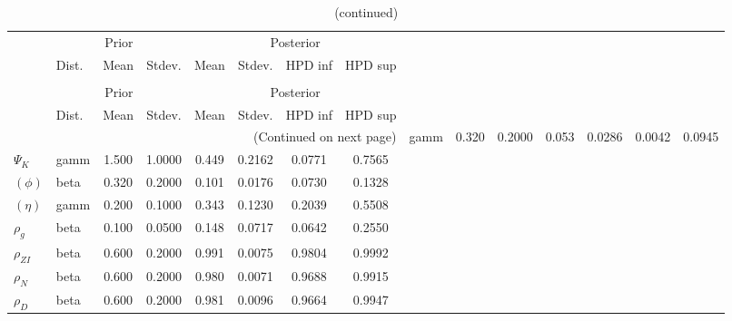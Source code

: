  
\begin{center}
\begin{longtable}{llcccccc} 
\caption{Results from Metropolis-Hastings (parameters)}
 \label{Table:MHPosterior:1}\\
\toprule 
  & \multicolumn{3}{c}{Prior}  &  \multicolumn{4}{c}{Posterior} \\
  \cmidrule(r{.75em}){2-4} \cmidrule(r{.75em}){5-8}
  & Dist. & Mean  & Stdev. & Mean & Stdev. & HPD inf & HPD sup\\
\midrule \endfirsthead 
\caption{(continued)}\\\toprule 
  & \multicolumn{3}{c}{Prior}  &  \multicolumn{4}{c}{Posterior} \\
  \cmidrule(r{.75em}){2-4} \cmidrule(r{.75em}){5-8}
  & Dist. & Mean  & Stdev. & Mean & Stdev. & HPD inf & HPD sup\\
\midrule \endhead 
\bottomrule \multicolumn{8}{r}{(Continued on next page)} \endfoot 
\bottomrule \endlastfoot 
${\sigma_a}$ & gamm &   0.320 & 0.2000 &   0.053& 0.0286 &  0.0042 &  0.0945 \\ 
${\Psi_K}$ & gamm &   1.500 & 1.0000 &   0.449& 0.2162 &  0.0771 &  0.7565 \\ 
$(\phi)$ & beta &   0.320 & 0.2000 &   0.101& 0.0176 &  0.0730 &  0.1328 \\ 
$(\eta)$ & gamm &   0.200 & 0.1000 &   0.343& 0.1230 &  0.2039 &  0.5508 \\ 
${\rho_g}$ & beta &   0.100 & 0.0500 &   0.148& 0.0717 &  0.0642 &  0.2550 \\ 
${\rho_{ZI}}$ & beta &   0.600 & 0.2000 &   0.991& 0.0075 &  0.9804 &  0.9992 \\ 
${\rho_N}$ & beta &   0.600 & 0.2000 &   0.980& 0.0071 &  0.9688 &  0.9915 \\ 
${\rho_D}$ & beta &   0.600 & 0.2000 &   0.981& 0.0096 &  0.9664 &  0.9947 \\ 
\end{longtable}
 \end{center}
